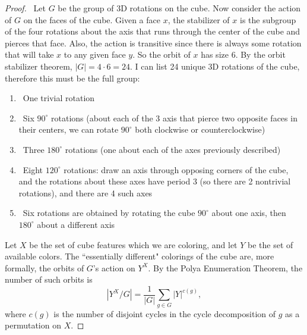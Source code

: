 \documentclass[12pt]{article}
\begin{document}
\begin{enumerate}[leftmargin=0cm,itemindent=.5cm,labelwidth=\itemindent,labelsep=0cm,align=left]
\begin{proof}
\ Let $G$ be the group of $3$D rotations on the cube.  Now consider the action of $G$ on the faces of the cube.  Given a face $x$, the stabilizer of $x$ is the subgroup of the four rotations about the axis that runs through the center of the cube and pierces that face.  Also, the action is transitive since there is always some rotation that will take $x$ to any given face $y$.  So the orbit of $x$ has size 6.  By the orbit stabilizer theorem, $|G| = 4 \cdot 6 = 24$.  I can list 24 unique 3D rotations of the cube, therefore this must be the full group:
\begin{enumerate}
\item \ One trivial rotation
\item \ Six $90^{\circ}$ rotations (about each of the 3 axis that pierce two opposite faces in their centers, we can rotate $90^{\circ}$ both clockwise or counterclockwise)
\item \ Three $180^{\circ}$ rotations (one about each of the axes previously described)
\item \ Eight $120^{\circ}$ rotations: draw an axis through opposing corners of the cube, and the rotations about these axes have period 3 (so there are 2 nontrivial rotations), and there are 4 such axes
\item \ Six rotations are obtained by rotating the cube $90^{\circ}$ about one axis, then $180^{\circ}$ about a different axis
\end{enumerate}

Let $X$ be the set of cube features which we are coloring, and let $Y$ be the set of available colors.  The ``essentially different" colorings of the cube are, more formally, the orbits of $G$'s action on $Y^X$.  By the Polya Enumeration Theorem, the number of such orbits is
$$|Y^X/G| = \frac{1}{|G|} \sum\limits_{g \in G} |Y|^{c(g)},$$ where $c(g)$ is the number of disjoint cycles in the cycle decomposition of $g$ as a permutation on $X$.


\end{proof}
\end{enumerate}
\end{document}
